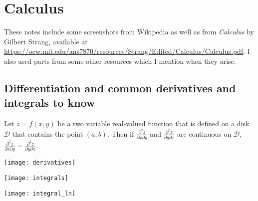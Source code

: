 %
%
%
%
%
%
%
%
%
%
%
%
%
%

\chapter{Calculus}

These notes include some screenshots from Wikipedia as well as from \textit{Calculus} by Gilbert Strang, available at \url{https://ocw.mit.edu/ans7870/resources/Strang/Edited/Calculus/Calculus.pdf}. I also used parts from some other resources which I mention when they arise.

\section{Differentiation and common derivatives and integrals to know}

\begin{theorem}Let \(z = f(x,y)\) be a two variable real-valued function that is defined on a disk \(\mathcal{D}\) that contains the point \((a,b)\). Then if \(\frac{ \partial^2 z}{\partial x \partial y} \) and \(\frac{ \partial^2 z}{\partial y \partial x} \) are continuous on \(\mathcal{D}\),  \(\frac{ \partial^2 z}{\partial x \partial y} = \frac{ \partial^2 z}{\partial y \partial x} \).

\end{theorem}

\texttt{[image: derivatives]}

\texttt{[image: integrals]}

\texttt{[image: integral\_ln]}

